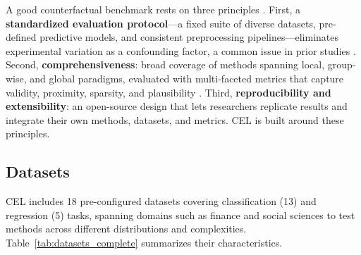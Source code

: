 \documentclass[runningheads]{llncs}
\begin{document}
A good counterfactual benchmark rests on three principles \cite{pawelczyk2021carla,de2021framework}. First, a \textbf{standardized evaluation protocol}---a fixed suite of diverse datasets, pre-defined predictive models, and consistent preprocessing pipelines---eliminates experimental variation as a confounding factor, a common issue in prior studies \cite{pineau2021improving}. Second, \textbf{comprehensiveness}: broad coverage of methods spanning local, group-wise, and global paradigms, evaluated with multi-faceted metrics that capture validity, proximity, sparsity, and plausibility \cite{guidotti2024counterfactual}. Third, \textbf{reproducibility and extensibility}: an open-source design that lets researchers replicate results and integrate their own methods, datasets, and metrics. CEL is built around these principles.

\subsection{Datasets}
CEL includes 18 pre-configured datasets covering classification (13) and regression (5) tasks, spanning domains such as finance and social sciences to test methods across different distributions and complexities. Table~\ref{tab:datasets_complete} summarizes their characteristics.
\end{document}
